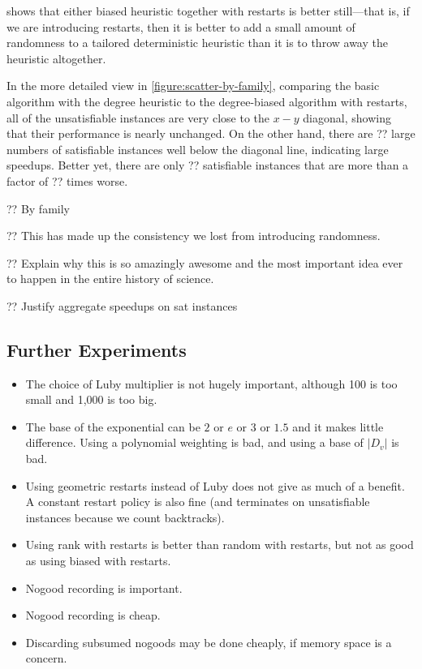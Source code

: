 \documentclass{article}
\begin{document}
 shows that either biased heuristic together with restarts is better
still---that is, if we are introducing restarts, then it is better to add a small amount of
randomness to a tailored deterministic heuristic than it is to throw away the heuristic altogether.

In the more detailed view in \cref{figure:scatter-by-family}, comparing the basic algorithm with the
degree heuristic to the degree-biased algorithm with restarts, all of the unsatisfiable instances
are very close to the $x-y$ diagonal, showing that their performance is nearly unchanged. On the
other hand, there are ?? large numbers of satisfiable instances well below the diagonal line,
indicating large speedups.  Better yet, there are only ?? satisfiable instances that are more than a
factor of ?? times worse.

?? By family

?? This has made up the consistency we lost from introducing randomness.

?? Explain why this is so amazingly awesome and the most important idea ever to happen in the entire
history of science.

?? Justify aggregate speedups on sat instances

\subsection{Further Experiments}

\begin{itemize}
    \item The choice of Luby multiplier is not hugely important, although 100 is too small and 1,000
        is too big.
    \item The base of the exponential can be $2$ or $e$ or $3$ or $1.5$ and it makes little
        difference. Using a polynomial weighting is bad, and using a base of $|D_v|$ is bad.
    \item Using geometric restarts instead of Luby does not give as much of a benefit. A constant
        restart policy is also fine (and terminates on unsatisfiable instances because we count
        backtracks).
    \item Using rank with restarts is better than random with restarts, but not as good as using
        biased with restarts.
    \item Nogood recording is important.
    \item Nogood recording is cheap.
    \item Discarding subsumed nogoods may be done cheaply, if memory space is a concern.
\end{itemize}
\end{document}
